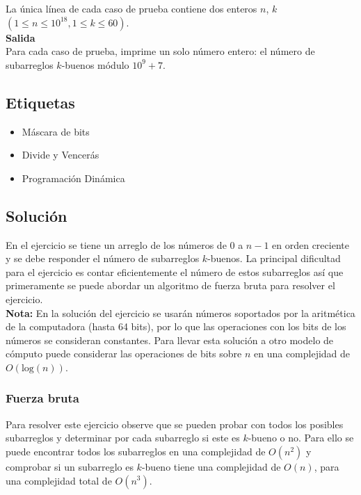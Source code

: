 \documentclass{article}
\begin{document}
La única línea de cada caso de prueba contiene dos enteros $n$, $k$ $(1 \leq n \leq 10^{18}, 1 \leq k \leq 60)$.\\

\textbf{Salida}\\

Para cada caso de prueba, imprime un solo número entero: el número de subarreglos $k$-buenos módulo $10^9 + 7$.

\subsection{Etiquetas}

\begin{itemize}
    \item Máscara de bits
    \item Divide y Vencerás
    \item Programación Dinámica
\end{itemize}

\subsection{Solución}

En el ejercicio se tiene un arreglo de los números de 0 a $n-1$ en orden creciente y se debe responder el número de subarreglos
$k$-buenos. La principal dificultad para el ejercicio es contar eficientemente el número de estos subarreglos así que primeramente
se puede abordar un algoritmo de fuerza bruta para resolver el ejercicio.\\

\textbf{Nota:} En la solución del ejercicio se usarán números soportados por la aritmética de la computadora (hasta 64 bits),
por lo que las operaciones con los bits de los números se consideran constantes. Para llevar esta solución a otro modelo de cómputo
puede considerar las operaciones de bits sobre $n$ en una complejidad de $O(\text{log}(n))$.

\subsubsection{Fuerza bruta}

Para resolver este ejercicio observe que se pueden probar con todos los posibles subarreglos y determinar por cada subarreglo
si este es $k$-bueno o no. Para ello se puede encontrar todos los subarreglos en una complejidad de $O(n^2)$ y comprobar si un
subarreglo es $k$-bueno tiene una complejidad de $O(n)$, para una complejidad total de $O(n^3)$.
\end{document}
